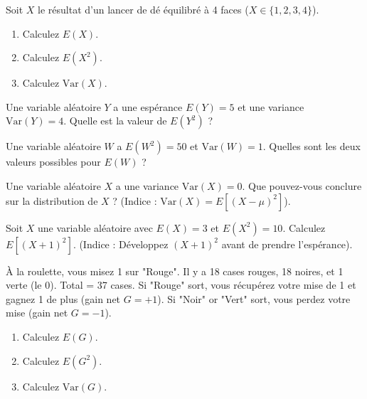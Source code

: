 
\begin{exercicebox}
Soit $X$ le résultat d'un lancer de dé équilibré à 4 faces ($X \in \{1, 2, 3, 4\}$).
\begin{enumerate}
    \item Calculez $E(X)$.
    \item Calculez $E(X^2)$.
    \item Calculez $\text{Var}(X)$.
\end{enumerate}
\end{exercicebox}

\begin{exercicebox}
Une variable aléatoire $Y$ a une espérance $E(Y) = 5$ et une variance $\text{Var}(Y) = 4$.
Quelle est la valeur de $E(Y^2)$ ?
\end{exercicebox}

\begin{exercicebox}
Une variable aléatoire $W$ a $E(W^2) = 50$ et $\text{Var}(W) = 1$.
Quelles sont les deux valeurs possibles pour $E(W)$ ?
\end{exercicebox}

\begin{exercicebox}
Une variable aléatoire $X$ a une variance $\text{Var}(X) = 0$. Que pouvez-vous conclure sur la distribution de $X$ ?
(Indice : $\text{Var}(X) = E[(X-\mu)^2]$).
\end{exercicebox}

\begin{exercicebox}
Soit $X$ une variable aléatoire avec $E(X)=3$ et $E(X^2)=10$.
Calculez $E[(X+1)^2]$.
(Indice : Développez $(X+1)^2$ avant de prendre l'espérance).
\end{exercicebox}

\begin{exercicebox}
À la roulette, vous misez 1 sur "Rouge". Il y a 18 cases rouges, 18 noires, et 1 verte (le 0). Total = 37 cases.
Si "Rouge" sort, vous récupérez votre mise de 1 et gagnez 1 de plus (gain net $G=+1$).
Si "Noir" or "Vert" sort, vous perdez votre mise (gain net $G=-1$).
\begin{enumerate}
    \item Calculez $E(G)$.
    \item Calculez $E(G^2)$.
    \item Calculez $\text{Var}(G)$.
\end{enumerate}
\end{exercicebox}


